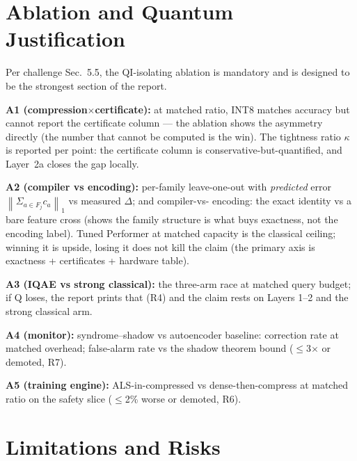 \documentclass[conference,10pt]{IEEEtran}
\newcommand{\norm}[1]{\left\lVert #1 \right\rVert}
\begin{document}
\section{Ablation and Quantum Justification}
\label{sec:ablation}

Per challenge Sec.~5.5, the QI-isolating ablation is mandatory and is designed
to be the strongest section of the report.

\textbf{A1 (compression$\times$certificate):} at matched ratio, INT8 matches
accuracy but cannot report the certificate column --- the ablation shows the
asymmetry directly (the number that cannot be computed is the win). The
tightness ratio $\kappa$ is reported per point: the certificate column is
conservative-but-quantified, and Layer~2a closes the gap locally.

\textbf{A2 (compiler vs encoding):} per-family leave-one-out with \emph{predicted}
error $\norm{\Sigma_{a\in F_j} c_a}_1$ vs measured $\Delta$; and compiler-vs-
encoding: the exact identity vs a bare feature cross (shows the family structure
is what buys exactness, not the encoding label). Tuned Performer at matched
capacity is the classical ceiling; winning it is upside, losing it does not kill
the claim (the primary axis is exactness + certificates + hardware table).

\textbf{A3 (IQAE vs strong classical):} the three-arm race at matched query
budget; if Q loses, the report prints that (R4) and the claim rests on Layers
1--2 and the strong classical arm.

\textbf{A4 (monitor):} syndrome--shadow vs autoencoder baseline: correction rate
at matched overhead; false-alarm rate vs the shadow theorem bound ($\le$3$\times$
or demoted, R7).

\textbf{A5 (training engine):} ALS-in-compressed vs dense-then-compress at
matched ratio on the safety slice ($\le$2\% worse or demoted, R6).

\section{Limitations and Risks}
\label{sec:limitations}
\end{document}
